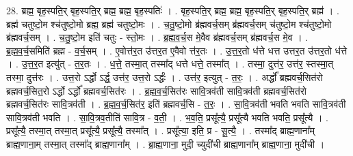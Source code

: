\documentclass[17pt]{extarticle}
\begin{document}
28. ब्रह्म॒ बृह॒स्पति॒र् बृह॒स्पति॒र् ब्रह्म॒ ब्रह्म॒ बृह॒स्पतिः॑ । . बृह॒स्पति॒र् ब्रह्म॒ ब्रह्म॒ बृह॒स्पति॒र् बृह॒स्पति॒र् ब्रह्म॑ । . ब्रह्म॑ चतुष्टो॒म श्च॑तुष्टो॒मो ब्रह्म॒ ब्रह्म॑ चतुष्टो॒मः । . च॒तु॒ष्टो॒मो ब्र॑ह्मवर्च॒सम् ब्र॑ह्मवर्च॒सम् च॑तुष्टो॒म श्च॑तुष्टो॒मो ब्र॑ह्मवर्च॒सम् । . च॒तु॒ष्टो॒म इति॑ चतुः - स्तो॒मः । . ब्र॒ह्म॒व॒र्च॒स मे॒वैव ब्र॑ह्मवर्च॒सम् ब्र॑ह्मवर्च॒स मे॒व । . ब्र॒ह्म॒व॒र्च॒समिति॑ ब्रह्म - व॒र्च॒सम् । . ए॒वोत्त॑र॒त उ॑त्तर॒त ए॒वैवो त्त॑र॒तः । . उ॒त्त॒र॒तो ध॑त्ते धत्त उत्तर॒त उ॑त्तर॒तो ध॑त्ते । . उ॒त्त॒र॒त इत्यु॑त् - त॒र॒तः । . ध॒त्ते॒ तस्मा॒त् तस्मा᳚द् धत्ते धत्ते॒ तस्मा᳚त् । . तस्मा॒ दुत्त॑र॒ उत्त॑र॒ स्तस्मा॒त् तस्मा॒ दुत्त॑रः । . उत्त॒रो ऽर्द्धो ऽर्द्ध॒ उत्त॑र॒ उत्त॒रो ऽर्द्धः॑ । . उत्त॑र॒ इत्युत् - त॒रः॒ । . अर्द्धो᳚ ब्रह्मवर्च॒सित॑रो ब्रह्मवर्च॒सित॒रो ऽर्द्धो ऽर्द्धो᳚ ब्रह्मवर्च॒सित॑रः । . ब्र॒ह्म॒व॒र्च॒सित॑रः सावि॒त्रव॑ती सावि॒त्रव॑ती ब्रह्मवर्च॒सित॑रो ब्रह्मवर्च॒सित॑रः सावि॒त्रव॑ती । . ब्र॒ह्म॒व॒र्च॒सित॑र॒ इति॑ ब्रह्मवर्च॒सि - त॒रः॒ । . सा॒वि॒त्रव॑ती भवति भवति सावि॒त्रव॑ती सावि॒त्रव॑ती भवति । . सा॒वि॒त्रव॒तीति॑ सावि॒त्र - व॒ती॒ । . भ॒व॒ति॒ प्रसू᳚त्यै॒ प्रसू᳚त्यै भवति भवति॒ प्रसू᳚त्यै । . प्रसू᳚त्यै॒ तस्मा॒त् तस्मा॒त् प्रसू᳚त्यै॒ प्रसू᳚त्यै॒ तस्मा᳚त् । . प्रसू᳚त्या॒ इति॒ प्र - सू॒त्यै॒ । . तस्मा᳚द् ब्राह्म॒णाना᳚म् ब्राह्म॒णाना॒म् तस्मा॒त् तस्मा᳚द् ब्राह्म॒णाना᳚म् । . ब्रा॒ह्म॒णाना॒ मुदी॒ च्युदी॑ची ब्राह्म॒णाना᳚म् ब्राह्म॒णाना॒ मुदी॑ची । \newline
\end{document}
